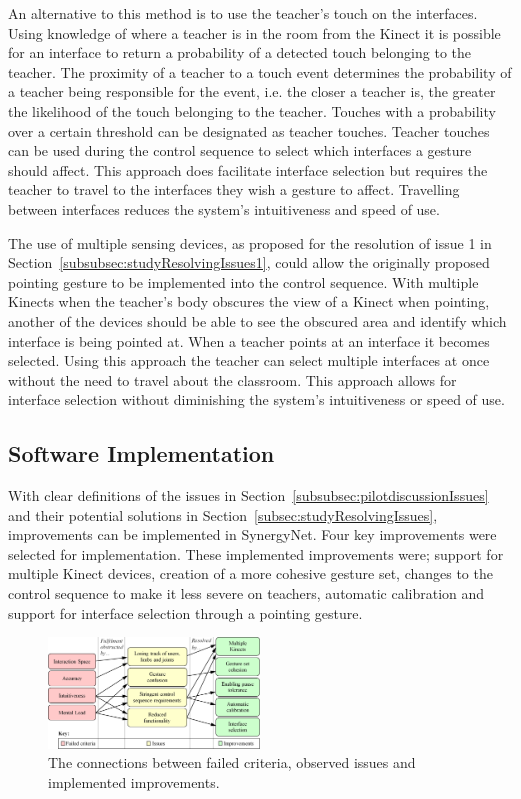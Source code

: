 \documentclass[link]{IWCOMP}
\begin{document}
An alternative to this method is to use the teacher's touch on the interfaces.
Using knowledge of where a teacher is in the room from the Kinect it is possible for an interface to return a probability of a detected touch belonging to the teacher.
The proximity of a teacher to a touch event determines the probability of a teacher being responsible for the event, i.e. the closer a teacher is, the greater the likelihood of the touch belonging to the teacher.
Touches with a probability over a certain threshold can be designated as teacher touches.
Teacher touches can be used during the control sequence to select which interfaces a gesture should affect.
This approach does facilitate interface selection but requires the teacher to travel to the interfaces they wish a gesture to affect.
Travelling between interfaces reduces the system's intuitiveness and speed of use.

The use of multiple sensing devices, as proposed for the resolution of issue 1 in Section~\ref{subsubsec:studyResolvingIssues1}, could allow the originally proposed pointing gesture to be implemented into the control sequence.
With multiple Kinects when the teacher's body obscures the view of a Kinect when pointing, another of the devices should be able to see the obscured area and identify which interface is being pointed at.
When a teacher points at an interface it becomes selected.
Using this approach the teacher can select multiple interfaces at once without the need to travel about the classroom.
This approach allows for interface selection without diminishing the system's intuitiveness or speed of use.

\subsection{Software Implementation}
\label{subsec:studyImplementation}

With clear definitions of the issues in Section~\ref{subsubsec:pilotdiscussionIssues} and their potential solutions in Section~\ref{subsec:studyResolvingIssues}, improvements can be implemented in SynergyNet.
Four key improvements were selected for implementation.
These implemented improvements were; support for multiple Kinect devices, creation of a more cohesive gesture set, changes to the control sequence to make it less severe on teachers, automatic calibration and support for interface selection through a pointing gesture.

\begin{figure}[h]
  \centering
  \includegraphics[width=0.5\textwidth]{figures/issue_flow_diagram.png}
  \caption{The connections between failed criteria, observed issues and implemented improvements.}
  \label{fig:issueFlow}
\end{figure}
\end{document}

